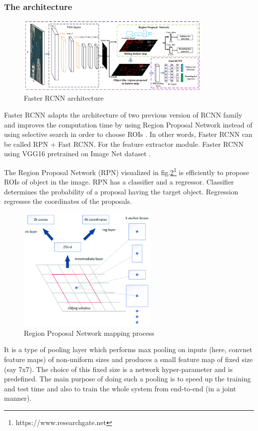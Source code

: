 \subsubsection{The architecture}
\begin{figure}[h!]
    \centering
    \includegraphics[width=0.85\textwidth]{Chapters/Fig/FrRCNN_arch.png}
    \caption{Faster \acrshort{RCNN} architecture}
    \label{fig:frrcnn_arc}
\end{figure}
Faster \acrshort{RCNN} adapts the architecture of two previous version of \acrshort{RCNN} family and improves the computation time by using Region Proposal Network instead of using selective search in order to choose \acrshort{ROI}s \cite{FrRCNN}. 
In other words, Faster \acrshort{RCNN} can be called \acrshort{RPN} + Fast \acrshort{RCNN}. For the feature extractor module. Faster \acrshort{RCNN} using VGG16\cite{vgg} pretrained on Image Net dataset \cite{FrRCNN}.\par
The Region Proposal Network (RPN) visualized in fig.\ref{fig:RPN}\footnote{https://www.researchgate.net} is efficiently to propose \acrshort{ROI}s of object in the image. 
\acrshort{RPN} has a classifier and a regressor. Classifier determines the probability of a proposal having the target object. Regression regresses the coordinates of the proposals.
\begin{figure}[h!]
    \centering
    \includegraphics[width=0.6\textwidth]{Chapters/Fig/RPN_arc_1.png}
    \caption{Region Proposal Network mapping process}
    \label{fig:RPN}
\end{figure}
\par
It is a type of pooling layer which performs max pooling on inputs (here, convnet feature maps) 
of non-uniform sizes and produces a small feature map of fixed size (say 7x7)\cite{FrRCNN}. 
The choice of this fixed size is a network hyper-parameter and is predefined.
The main purpose of doing such a pooling is to speed up the training and test time and also to train the whole system from end-to-end (in a joint manner)\cite{FrRCNN}.

